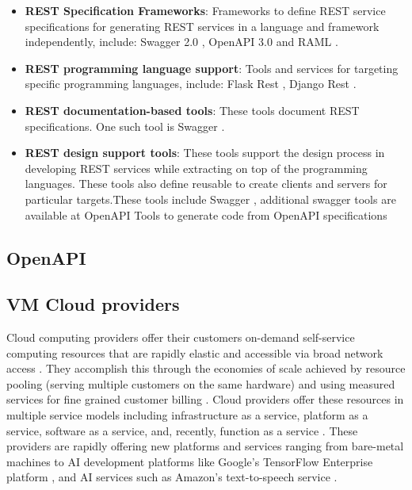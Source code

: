 \begin{itemize}
\tightlist
\item \textbf{REST Specification Frameworks}: Frameworks to define
  REST service specifications for generating REST services in a
  language and framework independently, include: Swagger 2.0
  \cite{openapi-2}, OpenAPI 3.0 \cite{openapi-3} and RAML
  \cite{raml-1}.
\item \textbf{REST programming language support}: Tools and services
  for targeting specific programming languages, include: Flask Rest
  \cite{www-flask-restful}, Django Rest \cite{www-django-rest}.
\item \textbf{REST documentation-based tools}: These tools document
  REST specifications. One such tool is Swagger \cite{www-swagger}.
\item \textbf{REST design support tools}: These tools support the
  design process in developing REST services while extracting on top
  of the programming languages. These tools also define reusable to
  create clients and servers for particular targets.These tools
  include Swagger \cite{www-swagger}, additional swagger tools are
  available at OpenAPI Tools \cite{www-openapi-tools} to generate code
  from OpenAPI specifications \cite{www-swagger-codegen}
\end{itemize}

\subsection{OpenAPI}


\subsection{VM Cloud providers}\label{vm-cloud-providers}

Cloud computing providers offer their customers on-demand self-service
computing resources that are rapidly elastic and accessible via broad
network access \cite{nist-cloud-standard}.
They accomplish this through the economies of scale achieved by resource
pooling (serving multiple customers on the same hardware) and using
measured services for fine grained customer billing \cite{nist-cloud-standard}.
Cloud providers offer these resources in multiple service models
including infrastructure as a service, platform as a service, software
as a service, and, recently, function as a service
\cite{nist-cloud-standard}.
These providers are rapidly offering new platforms and services ranging
from bare-metal machines to AI development platforms like Google's
TensorFlow Enterprise platform \cite{www-tensorflow-enterprise}, and AI services
such as Amazon's text-to-speech service \cite{amazon-polly}.


